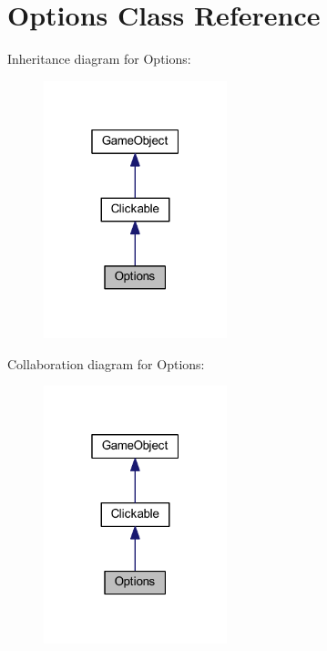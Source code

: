 \hypertarget{class_options}{\section{Options Class Reference}
\label{class_options}
}


Inheritance diagram for Options\+:\nopagebreak
\begin{figure}[H]
\begin{center}
\leavevmode
\includegraphics[width=151pt]{class_options__inherit__graph}
\end{center}
\end{figure}


Collaboration diagram for Options\+:\nopagebreak
\begin{figure}[H]
\begin{center}
\leavevmode
\includegraphics[width=151pt]{class_options__coll__graph}
\end{center}
\end{figure}
